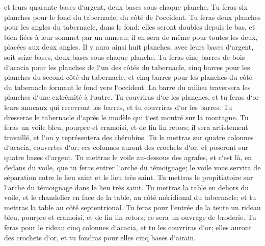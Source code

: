 \verse et leurs quarante bases d`argent, deux bases sous chaque planche. 
\verse Tu feras six planches pour le fond du tabernacle, du côté de l`occident. 
\verse Tu feras deux planches pour les angles du tabernacle, dans le fond; 
\verse elles seront doubles depuis le bas, et bien liées à leur sommet par un anneau; il en sera de même pour toutes les deux, placées aux deux angles. 
\verse Il y aura ainsi huit planches, avec leurs bases d`argent, soit seize bases, deux bases sous chaque planche. 
\verse Tu feras cinq barres de bois d`acacia pour les planches de l`un des côtés du tabernacle, 
\verse cinq barres pour les planches du second côté du tabernacle, et cinq barres pour les planches du côté du tabernacle formant le fond vers l`occident. 
\verse La barre du milieu traversera les planches d`une extrémité à l`autre. 
\verse Tu couvriras d`or les planches, et tu feras d`or leurs anneaux qui recevront les barres, et tu couvriras d`or les barres. 
\verse Tu dresseras le tabernacle d`après le modèle qui t`est montré sur la montagne. 
\verse Tu feras un voile bleu, pourpre et cramoisi, et de fin lin retors; il sera artistement travaillé, et l`on y représentera des chérubins. 
\verse Tu le mettras sur quatre colonnes d`acacia, couvertes d`or; ces colonnes auront des crochets d`or, et poseront sur quatre bases d`argent. 
\verse Tu mettras le voile au-dessous des agrafes, et c`est là, en dedans du voile, que tu feras entrer l`arche du témoignage; le voile vous servira de séparation entre le lieu saint et le lieu très saint. 
\verse Tu mettras le propitiatoire sur l`arche du témoignage dans le lieu très saint. 
\verse Tu mettras la table en dehors du voile, et le chandelier en face de la table, au côté méridional du tabernacle; et tu mettras la table au côté septentrional. 
\verse Tu feras pour l`entrée de la tente un rideau bleu, pourpre et cramoisi, et de fin lin retors; ce sera un ouvrage de broderie. 
\verse Tu feras pour le rideau cinq colonnes d`acacia, et tu les couvriras d`or; elles auront des crochets d`or, et tu fondras pour elles cinq bases d`airain. 

\chapter{}

